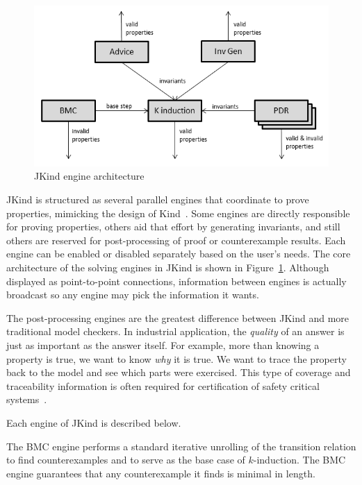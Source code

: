 \documentclass{llncs}
\newcommand{\jkind}{{\sc JKind}\xspace}
\newcommand{\kind}{{\sc Kind}\xspace}
\renewcommand{\paragraph}[1]{\vspace{5pt}\noindent {\bf #1}}
\begin{document}
\begin{figure}
  \begin{center}
    \includegraphics[scale=0.7]{engines.png}
  \end{center}
  \vspace{-2em}
  \caption{\jkind engine architecture}
  \vspace{-1em}
  \label{fig:engines}
\end{figure}

\jkind is structured as several parallel engines that coordinate to
prove properties, mimicking the design of \kind~\cite{kahsai2011pdmc}.
Some engines are directly responsible for proving properties, others
aid that effort by generating invariants, and still others are
reserved for post-processing of proof or counterexample results. Each
engine can be enabled or disabled separately based on the user's
needs. The core architecture of the solving engines in \jkind is shown
in Figure~\ref{fig:engines}. Although displayed as point-to-point
connections, information between engines is actually broadcast so any
engine may pick the information it wants.

The post-processing engines are the greatest difference between \jkind
and more traditional model checkers. In industrial application, the
{\em quality} of an answer is just as important as the answer itself.
For example, more than knowing a property is true, we want to know
{\em why} it is true. We want to trace the property back to the model
and see which parts were exercised. This type of coverage and
traceability information is often required for certification of safety
critical systems~\cite{DO178C}.

Each engine of \jkind is described below.

\paragraph{Bounded Model Checking (BMC).} The BMC engine performs a
standard iterative unrolling of the transition relation to find
counterexamples and to serve as the base case of $k$-induction. The
BMC engine guarantees that any counterexample it finds is minimal in
length.
\end{document}
